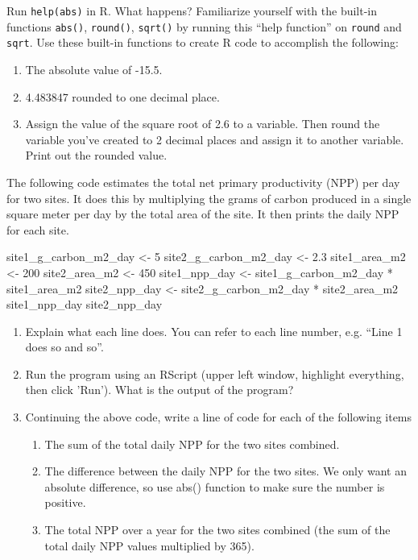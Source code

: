 
\begin{q} 
  Run \texttt{help(abs)} in R. What happens?  Familiarize yourself
  with the built-in functions \texttt{abs()}, \texttt{round()},
  \texttt{sqrt()} by running this ``help function'' on \texttt{round}
  and \texttt{sqrt}. Use these built-in functions to create R code to
  accomplish the following:

  \begin{enumerate}
  \item The absolute value of -15.5.   
  \item 4.483847 rounded to one decimal place. 
  \item Assign the value of the square root of 2.6 to a variable. Then
    round the variable you’ve created to 2 decimal places and assign
    it to another variable. Print out the rounded value.
  \end{enumerate} 
\end{q}


\begin{q}
  The following code estimates the total net primary productivity
  (NPP) per day for two sites. It does this by multiplying the grams
  of carbon produced in a single square meter per day by the total
  area of the site. It then prints the daily NPP for each site.

\begin{rcode}
site1_g_carbon_m2_day <- 5 
site2_g_carbon_m2_day <- 2.3 
site1_area_m2 <- 200 
site2_area_m2 <- 450 
site1_npp_day <- site1_g_carbon_m2_day * site1_area_m2 
site2_npp_day <- site2_g_carbon_m2_day * site2_area_m2 
site1_npp_day 
site2_npp_day 
\end{rcode}

\begin{enumerate}
\item Explain what each line does. You can refer to each line number, e.g. ``Line 1 does so and so''. 
\item Run the program using an RScript (upper left window, highlight
  everything, then click 'Run'). What is the output of the program?
\item Continuing the above code, write a line of code for each of the
  following items
  \begin{enumerate}
  \item The sum of the total daily NPP for the two sites combined.  
  \item The difference between the daily NPP for the two sites. We
    only want an absolute difference, so use abs() function to make
    sure the number is positive.  
  \item The total NPP over a year for the two sites combined (the sum
    of the total daily NPP values multiplied by 365).
  \end{enumerate}  
\end{enumerate}

\end{q} 


